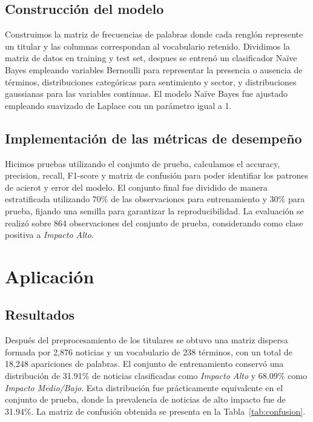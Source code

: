 \documentclass{Academic}
\begin{document}
\subsection{Construcción del modelo}
Construimos la matriz de frecuencias de palabras donde cada renglón represente un titular y las columnas
correspondan al vocabulario retenido. Dividimos la matriz de datos en training y test set, despues se entrenó 
un clasificador Naïve Bayes empleando variables Bernoulli para representar la presencia o ausencia de 
términos, distribuciones categóricas para sentimiento y sector, y distribuciones gaussianas para las variables 
continuas. El modelo Naïve Bayes fue ajustado empleando suavizado de Laplace con un parámetro igual a 1.


\subsection{Implementación de las métricas de desempeño}
Hicimos pruebas utilizando el conjunto de prueba, calculamos el accuracy, precision, recall, 
F1-score y matriz de confusión para poder identifiar los patrones de acierot y error del modelo.
El conjunto final fue dividido de manera estratificada utilizando 70\% de las observaciones para entrenamiento 
y 30\% para prueba, fijando una semilla para garantizar la reproducibilidad. La evaluación se 
realizó sobre 864 observaciones del conjunto de prueba, considerando como clase 
positiva a \textit{Impacto Alto}.


\section{Aplicación}

\subsection{Resultados}

Después del preprocesamiento de los titulares se obtuvo una matriz dispersa formada por 2,876 noticias y un vocabulario 
de 238 términos, con un total de 18,248 apariciones de palabras. El conjunto de entrenamiento conservó una distribución de 31.91\% de noticias clasificadas como \textit{Impacto Alto} y 68.09\% como 
\textit{Impacto Medio/Bajo}. Esta distribución fue prácticamente equivalente en el conjunto de prueba, 
donde la prevalencia de noticias de alto impacto fue de 31.94\%. La matriz de confusión obtenida 
se presenta en la Tabla~\ref{tab:confusion}.
\end{document}
